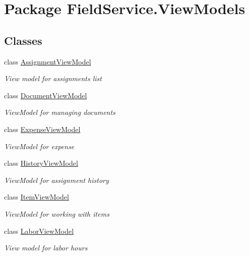 \hypertarget{namespace_field_service_1_1_view_models}{\section{Package Field\+Service.\+View\+Models}
\label{namespace_field_service_1_1_view_models}
}
\subsection*{Classes}
\begin{DoxyCompactItemize}
\item 
class \hyperlink{class_field_service_1_1_view_models_1_1_assignment_view_model}{Assignment\+View\+Model}
\begin{DoxyCompactList}\small\item\em View model for assignments list \end{DoxyCompactList}\item 
class \hyperlink{class_field_service_1_1_view_models_1_1_document_view_model}{Document\+View\+Model}
\begin{DoxyCompactList}\small\item\em View\+Model for managing documents \end{DoxyCompactList}\item 
class \hyperlink{class_field_service_1_1_view_models_1_1_expense_view_model}{Expense\+View\+Model}
\begin{DoxyCompactList}\small\item\em View\+Model for expense \end{DoxyCompactList}\item 
class \hyperlink{class_field_service_1_1_view_models_1_1_history_view_model}{History\+View\+Model}
\begin{DoxyCompactList}\small\item\em View\+Model for assignment history \end{DoxyCompactList}\item 
class \hyperlink{class_field_service_1_1_view_models_1_1_item_view_model}{Item\+View\+Model}
\begin{DoxyCompactList}\small\item\em View\+Model for working with items \end{DoxyCompactList}\item 
class \hyperlink{class_field_service_1_1_view_models_1_1_labor_view_model}{Labor\+View\+Model}
\begin{DoxyCompactList}\small\item\em View model for labor hours \end{DoxyCompactList}\item 

\end{DoxyCompactItemize}
